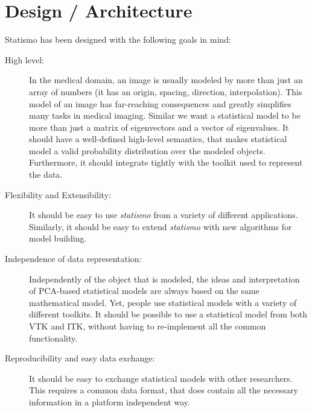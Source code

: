 \documentclass{InsightArticle}
\newcommand{\statismo}{\emph{statismo}\xspace}
\begin{document}
\section{Design / Architecture}
Statismo has been designed with the following goals in mind:
\begin{description}
\item[High level:] 
In the medical domain, an image is usually modeled by more than just an array of
numbers (it has an origin, spacing, direction, interpolation). This model of an
image has far-reaching consequences and greatly simplifies many tasks in medical imaging. Similar we want a statistical model to be more than just a matrix of eigenvectors and a vector of eigenvalues.
It should have a well-defined high-level semantics, that makes statistical model
a valid probability distribution over the modeled objects. Furthermore, it should integrate tightly with the toolkit used to represent the data.
\item[Flexibility and Extensibility:]
  It should be easy to use \statismo from a variety of different applications. Similarly, it should be easy to extend \statismo with new algorithms for model building. 
  
\item[Independence of data representation:]
  Independently of the object that is modeled, the ideas and interpretation of
  PCA-based statistical models are always based on the same mathematical model.
  Yet, people use statistical models with a variety of different toolkits. It should be possible to use a statistical model from both VTK and ITK, without having to
  re-implement all the common functionality. 
  
\item[Reproducibility and easy data exchange:]
  It should be easy to exchange statistical models with other researchers. This requires a common data format, that does contain all the necessary information in a platform independent way. 
\end{description}
\end{document}
